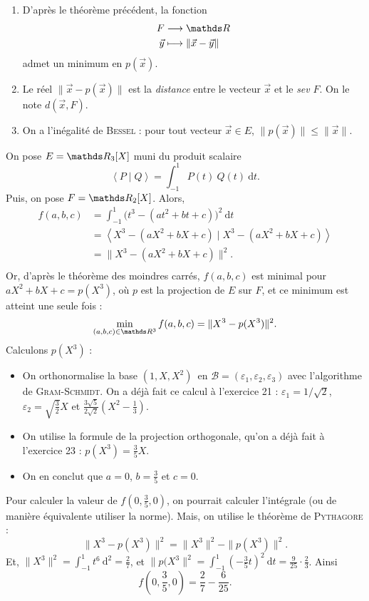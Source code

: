 \begin{rmk}
	\begin{enumerate}
		\item D'après le théorème précédent, la fonction \begin{align*}
				F &\longrightarrow \R \\
				\vec{y} &\longmapsto \|\vec{x} - \vec{y}\|
			\end{align*}
			admet un minimum en $p(\vec{x})$.
		\item Le réel $\|\vec{x} - p(\vec{x})\|$\/ est la \textit{distance} entre le vecteur $\vec{x}$\/ et le \textit{sev} $F$. On le note $d(\vec{x},F)$.
		\item On a l'inégalité de \textsc{Bessel} : pour tout vecteur $\vec{x} \in E$, $\|p(\vec{x})\| \le \|\vec{x}\|$.
	\end{enumerate}
\end{rmk}

\begin{exo}
	On pose $E = \R_3[X]$\/ muni du produit scalaire \[
		\left<P \mid Q \right> = \int_{-1}^{1} P(t)\:Q(t)~\mathrm{d}t
	.\] Puis, on pose $F = \R_2[X]$. Alors,
	\begin{align*}
		f(a,b,c) &= \int_{-1}^{1} \big(t^3 - (at^2 + bt + c)\big)^2~\mathrm{d}t\\
		&= \left< X^3 - (aX^2 + bX + c)  \mid X^3 - (aX^2 + bX + c) \right>\\
		&= \|X^3 - (aX^2 + bX + c)\|^2. \\
	\end{align*}
	Or, d'après le théorème des moindres carrés, $f(a,b,c)$\/ est minimal pour $aX^2 + bX + c = p(X^3)$, où $p$\/ est la projection de $E$\/ sur $F$, et ce minimum est atteint une seule fois : \[
		\min_{(a,b,c)\in \R^3} f(a,b,c) = \|X^3 - p(X^3)\|^2
	.\]
	Calculons $p(X^3)$ :
	\begin{itemize}
		\item On orthonormalise la base $(1, X, X^2)$\ en $\mathcal{B} = (\varepsilon_1, \varepsilon_2, \varepsilon_3)$ avec l'algorithme de \textsc{Gram}-\textsc{Schmidt}. On a déjà fait ce calcul à l'exercice 21 : $\varepsilon_1 = 1 / \sqrt{2}$, $\varepsilon_2 = \sqrt{\frac{3}{2}} X$\/ et $\frac{3\sqrt{5}}{2\sqrt{2}}\left( X^2 - \frac{1}{3} \right)$.
		\item On utilise la formule de la projection orthogonale, qu'on a déjà fait à l'exercice 23 : $p(X^3) = \frac{3}{5}X$.
		\item On en conclut que $a = 0$, $b = \frac{3}{5}$\/ et $c = 0$.
	\end{itemize}
	Pour calculer la valeur de $f(0, \frac{3}{5}, 0)$, on pourrait calculer l'intégrale (ou de manière équivalente utiliser la norme). Mais, on utilise le théorème de \textsc{Pythagore} : \[
		\|X^3 - p(X^3)\|^2 = \|X^3\|^2 - \|p(X^3)\|^2
	.\]
	Et, $\|X^3\|^2 = \int_{-1}^{1} t^6~\mathrm{d}^2 = \frac{2}{7}$, et $\|p(X^3\|^2 = \int_{-1}^{1} \left( -\frac{3}{5} t \right)^2~\mathrm{d}t = \frac{9}{25} \cdot \frac{2}{3}$. Ainsi \[
		f\left(0, \frac{3}{5}, 0\right) = \frac{2}{7} - \frac{6}{25}
	.\]
\end{exo}

